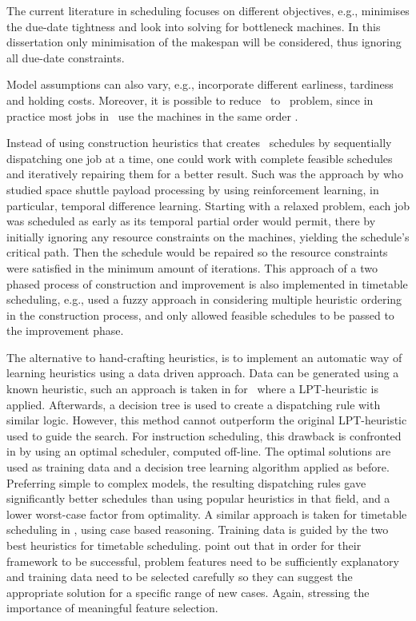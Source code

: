 The current literature in scheduling focuses on different objectives, e.g., \citet{Chang96} minimises the due-date tightness and \citet{Drobouchevitch2000,Gao2007} look into solving for bottleneck machines. In this dissertation only minimisation of the makespan will be considered, thus ignoring all due-date constraints. 

Model assumptions can also vary, e.g., \citet{Thiagarajan05} incorporate different earliness, tardiness and holding costs. 
Moreover, it is possible to reduce \jsp\  to \fsp\ problem, since in practice most jobs in \jsp\ use the machines in the same order \citep{Guinet1998,Ho2007}.

Instead of using construction heuristics that creates \jsp\ schedules by sequentially dispatching one job at a time, one could work with complete feasible schedules and iteratively repairing them for a better result. Such was the approach by \cite{Zhang95} who studied space shuttle payload processing by using reinforcement learning, in particular, temporal difference learning. Starting with a relaxed problem, each job was scheduled as early as its temporal partial order would permit, there by initially ignoring any resource constraints on the machines, yielding the schedule's critical path. Then the schedule would be repaired so the resource constraints were satisfied in the minimum amount of iterations.
This approach of a two phased process of construction and improvement is also implemented in timetable scheduling, e.g., \citet{Asmuni09} used a fuzzy approach in considering multiple heuristic ordering in the construction process, and only allowed feasible schedules to be passed to the improvement phase. 

The alternative to hand-crafting heuristics, is to implement an automatic way of learning heuristics using a data driven approach. %
Data can be generated using a known heuristic, such an approach is taken in \cite{Siggi05} for \jsp\, where a LPT-heuristic is applied. Afterwards, a decision tree is used to create a dispatching rule with similar logic. However, this method cannot outperform the original LPT-heuristic used to guide the search. For instruction scheduling, this drawback is confronted in \citet{Malik08,Russell09,Siggi10} by using an optimal scheduler, computed off-line. The optimal solutions are used as training data and a decision tree learning algorithm applied as before. Preferring simple to complex models, the resulting dispatching rules gave significantly better schedules than using popular heuristics in that field, and a lower worst-case factor from optimality. A similar approach is taken for timetable scheduling in \cite{Burke06}, using case based reasoning. Training data is guided by the two best heuristics for timetable scheduling. \citeauthor{Burke06} point out that in order for their framework to be successful, problem features need to be sufficiently explanatory and training data need to be selected carefully so they can suggest the appropriate solution for a specific range of new cases. Again, stressing the importance of meaningful feature selection. 

